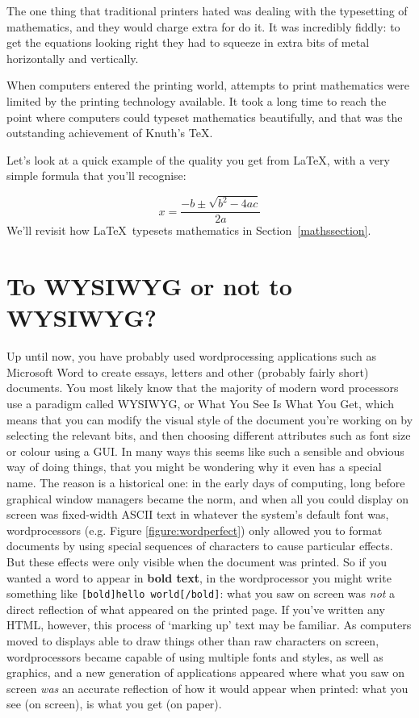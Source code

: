 The one thing that traditional printers hated was dealing with the typesetting of mathematics, and they would charge extra for do it. It was incredibly fiddly: to get the equations looking right they had to squeeze in extra bits of metal horizontally and vertically. 

When computers entered the printing world, attempts to print mathematics were limited by the printing technology available. It took a long time to reach the point where computers could typeset mathematics beautifully, and that was the outstanding achievement of Knuth's \TeX.

Let's look at a quick example of the quality you get from \LaTeX, with a very simple formula that you'll recognise:

\[ x = \frac{-b \pm \sqrt{b^2-4ac}}{2a} \]
%
We'll revisit how \LaTeX\ typesets mathematics in Section~\ref{mathssection}.

\section{To WYSIWYG or not to WYSIWYG?}
Up until now, you have probably used wordprocessing applications such as Microsoft Word to create essays, letters and other (probably fairly short) documents. You most likely know that the majority of modern word processors use a paradigm called WYSIWYG, or What You See Is What You Get, which means that you can modify the visual style of the document you're working on by selecting the relevant bits, and then choosing different attributes such as font size or colour using a GUI. In many ways this seems like such a sensible and obvious way of doing things, that you might be wondering why it even has a special name. The reason is a historical one: in the early days of computing, long before graphical window managers became the norm, and when all you could display on screen was fixed-width ASCII text in whatever the system's default font was, wordprocessors (e.g. Figure \ref{figure:wordperfect}) only allowed you to format documents by using special sequences of characters to cause particular effects. But these effects were only visible when the document was printed. So if you wanted a word to appear in \textbf{bold text}, in the wordprocessor you might write something like \texttt{[bold]hello world[/bold]}: what you saw on screen was \emph{not} a direct reflection of what appeared on the printed page. If you've written any HTML, however, this process of `marking up' text may be familiar. As computers moved to displays able to draw things other than raw characters on screen, wordprocessors became capable of using multiple fonts and styles, as well as graphics, and a new generation of applications appeared where what you saw on screen \emph{was} an accurate reflection of how it would appear when printed: what you see (on screen), is what you get (on paper). 

